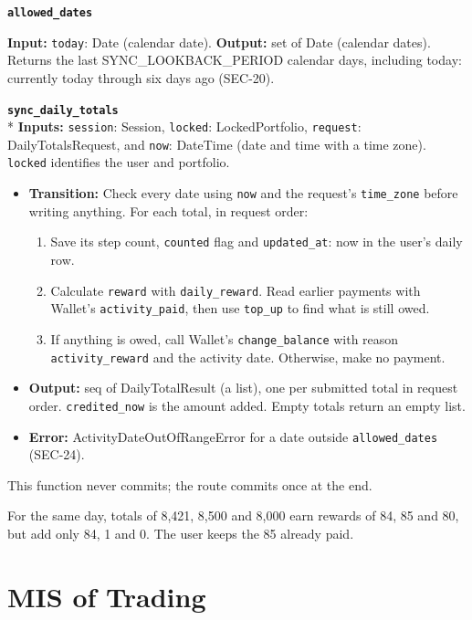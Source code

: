 \documentclass[12pt, titlepage]{article}
\begin{document}
\medskip
\noindent \textbf{\texttt{allowed\_dates}}

\noindent \textbf{Input:} \texttt{today}: Date (calendar date).
\textbf{Output:} set of Date (calendar dates).
Returns the last SYNC\_LOOKBACK\_PERIOD calendar days, including today:
currently today through six days ago (SEC-20).

\medskip
\noindent \textbf{\texttt{sync\_daily\_totals}}\\*
\textbf{Inputs:} \texttt{session}: Session,
\texttt{locked}: LockedPortfolio, \texttt{request}: DailyTotalsRequest,
and \texttt{now}: DateTime (date and time with a time zone).
\texttt{locked} identifies the user and portfolio.
\begin{itemize}
\raggedright
\item \textbf{Transition:} Check every date using \texttt{now} and the
  request's \texttt{time\_zone} before writing anything. For each total,
  in request order:
  \begin{enumerate}
  \item Save its step count, \texttt{counted} flag and
    \texttt{updated\_at}: now in the user's daily row.
  \item Calculate \texttt{reward} with \texttt{daily\_reward}. Read earlier
    payments with Wallet's \texttt{activity\_paid}, then use
    \texttt{top\_up} to find what is still owed.
  \item If anything is owed, call Wallet's \texttt{change\_balance} with
    reason \texttt{activity\_reward} and the activity date. Otherwise, make
    no payment.
  \end{enumerate}
\item \textbf{Output:} seq of DailyTotalResult (a list), one per submitted total in
  request order. \texttt{credited\_now} is the amount added. Empty totals
  return an empty list.
\item \textbf{Error:} ActivityDateOutOfRangeError for a date outside
  \texttt{allowed\_dates} (SEC-24).
\end{itemize}

\noindent This function never commits; the route commits once at the end.

\noindent For the same day, totals of 8,421, 8,500 and 8,000 earn rewards
of 84, 85 and 80, but add only 84, 1 and 0. The user keeps the 85 already paid.

\newpage

\section{MIS of Trading} \label{MisTrading}
\end{document}
